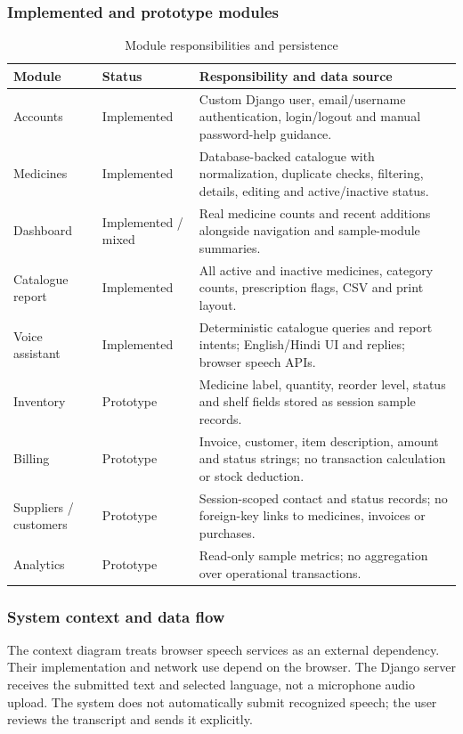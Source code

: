 \documentclass{article}
\begin{document}
\subsubsection{Implemented and prototype modules}
\begin{table}[H]
\centering\small
\caption{Module responsibilities and persistence}
\begin{tabularx}{\textwidth}{L{29mm}L{23mm}Y}
\toprule Module & Status & Responsibility and data source\\\midrule
Accounts & Implemented & Custom Django user, email/username authentication, login/logout and manual password-help guidance.\\
Medicines & Implemented & Database-backed catalogue with normalization, duplicate checks, filtering, details, editing and active/inactive status.\\
Dashboard & Implemented / mixed & Real medicine counts and recent additions alongside navigation and sample-module summaries.\\
Catalogue report & Implemented & All active and inactive medicines, category counts, prescription flags, CSV and print layout.\\
Voice assistant & Implemented & Deterministic catalogue queries and report intents; English/Hindi UI and replies; browser speech APIs.\\
Inventory & Prototype & Medicine label, quantity, reorder level, status and shelf fields stored as session sample records.\\
Billing & Prototype & Invoice, customer, item description, amount and status strings; no transaction calculation or stock deduction.\\
Suppliers / customers & Prototype & Session-scoped contact and status records; no foreign-key links to medicines, invoices or purchases.\\
Analytics & Prototype & Read-only sample metrics; no aggregation over operational transactions.\\
\bottomrule
\end{tabularx}
\end{table}

\subsubsection{System context and data flow}
The context diagram treats browser speech services as an external dependency. Their implementation and network use depend on the browser. The Django server receives the submitted text and selected language, not a microphone audio upload. The system does not automatically submit recognized speech; the user reviews the transcript and sends it explicitly.
\end{document}
